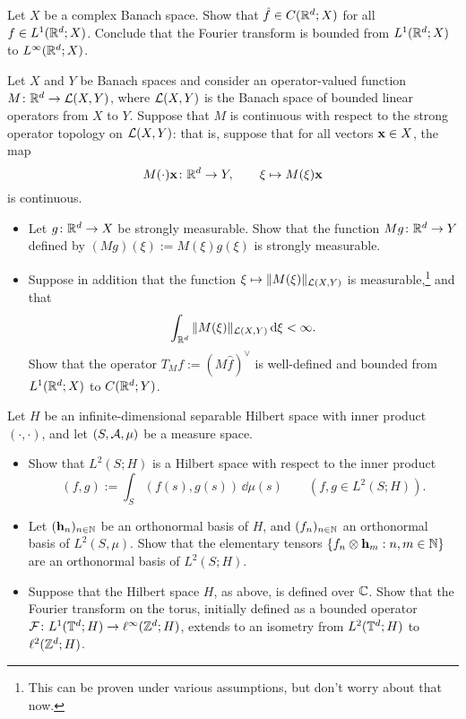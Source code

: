 \begin{exercise}\label{ex:FT-bounded-1-infty}
  Let $X$ be a complex Banach space.
  Show that $\hat{f} \in C(\mathbb{R}^d;X)$ for all $f \in L^1(\mathbb{R}^d;X)$.
  Conclude that the Fourier transform is bounded from $L^1(\mathbb{R}^d;X)$ to $L^\infty(\mathbb{R}^d;X)$.
\end{exercise}

\begin{exercise}
  Let $X$ and $Y$ be Banach spaces and consider an operator-valued function $M \colon \mathbb{R}^d \rightarrow \mathcal{L}(X,Y)$, where $\mathcal{L}(X,Y)$ is the Banach space of bounded linear operators from $X$ to $Y$.
  Suppose that $M$ is continuous with respect to the strong operator topology on $\mathcal{L}(X,Y)$: that is, suppose that for all vectors $\mathbf{x} \in X$, the map
  \begin{equation*}
    M(\cdot)\mathbf{x} \colon \mathbb{R}^d \rightarrow Y, \qquad \xi \mapsto M(\xi)\mathbf{x}
  \end{equation*}
  is continuous.
  \begin{itemize}
  \item
    Let $g \colon \mathbb{R}^d \rightarrow X$ be strongly measurable.
    Show that the function $Mg \colon \mathbb{R}^d \rightarrow Y$ defined by $(Mg)(\xi) := M(\xi)g(\xi)$ is strongly measurable.
  \item
    Suppose in addition that the function $\xi \mapsto \|M(\xi)\|_{\mathcal{L}(X,Y)}$ is measurable,\footnote{This can be proven under various assumptions, but don't worry about that now.} and that
    \begin{equation*}
      \int_{\mathbb{R}^d} \|M(\xi)\|_{\mathcal{L}(X,Y)} \, \mathrm{d} \xi < \infty.
    \end{equation*}
    Show that the operator $T_Mf := (M\hat{f})^\vee$ is well-defined and bounded from $L^1(\mathbb{R}^d;X)$ to $C(\mathbb{R}^d;Y)$.
  \end{itemize}
\end{exercise}

\begin{exercise}
  Let $H$ be an infinite-dimensional separable Hilbert space with inner product $(\cdot , \cdot)$, and let $(S,\mathcal{A},\mu)$ be a measure space.
  \begin{itemize}
  \item Show that $L^2(S;H)$ is a Hilbert space with respect to the inner product
    \begin{equation*}
      (f, g) := \int_{S} (f(s), g(s)) \, \dd\mu(s) \qquad (f,g \in L^2(S;H)).
    \end{equation*}
  \item Let $(\mathbf{h}_n)_{n \in \mathbb{N}}$ be an orthonormal basis of $H$, and $(f_n)_{n \in \mathbb{N}}$ an orthonormal basis of $L^2(S,\mu)$.
    Show that the elementary tensors $\{f_n \otimes \mathbf{h}_m : n,m \in \mathbb{N}\}$ are an orthonormal basis of $L^2(S;H)$.
  \item Suppose that the Hilbert space $H$, as above, is defined over $\mathbb{C}$.
    Show that the Fourier transform on the torus, initially defined as a bounded operator $\mathcal{F} \colon L^1(\mathbb{T}^d;H) \rightarrow \ell^\infty(\mathbb{Z}^d;H)$, extends to an isometry from $L^2(\mathbb{T}^d;H)$ to $\ell^2(\mathbb{Z}^d;H)$.
  \end{itemize}
\end{exercise}




